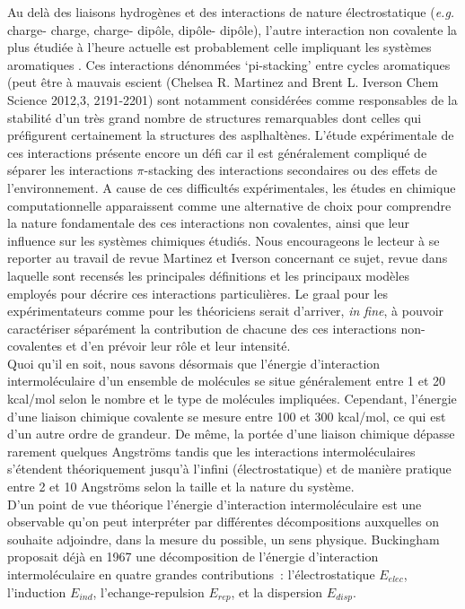 Au delà des liaisons hydrogènes et des interactions de nature électrostatique (\textit{e.g.} charge- charge, charge- dipôle, dipôle- dipôle), l’autre interaction non covalente la plus étudiée à l’heure actuelle est probablement celle impliquant les systèmes aromatiques \cite{grimme2008special}. Ces interactions dénommées ‘pi-stacking’ entre cycles aromatiques (peut être à mauvais escient (Chelsea R. Martinez and Brent L. Iverson Chem Science 2012,3, 2191-2201) sont notamment considérées comme responsables de la stabilité d’un très grand nombre de structures remarquables \cite{mcgaughey1998pi} dont celles qui préfigurent certainement la structures des asplhaltènes. L’étude expérimentale de ces interactions présente encore un défi car il est généralement compliqué de séparer les interactions $\pi$-stacking des interactions secondaires ou des effets de l’environnement. A cause de ces difficultés expérimentales, les études en chimique computationnelle apparaissent comme une alternative de choix pour comprendre la nature fondamentale des ces interactions non covalentes, ainsi que leur influence sur les systèmes chimiques étudiés. Nous encourageons le lecteur à se reporter au travail de revue Martinez et Iverson concernant ce sujet, revue dans laquelle sont recensés les principales définitions et les principaux modèles employés pour décrire ces interactions particulières.
Le graal pour les expérimentateurs comme pour les théoriciens serait d’arriver, \textit{in fine}, à pouvoir caractériser séparément la contribution de chacune des ces interactions non-covalentes et d’en prévoir leur rôle et leur intensité.\\

Quoi qu’il en soit, nous savons désormais que l’énergie d'interaction intermoléculaire d'un ensemble de molécules se situe généralement entre 1 et 20 kcal/mol selon le nombre et le type de molécules impliquées. Cependant, l'énergie d'une liaison chimique covalente se mesure entre 100 et 300 kcal/mol, ce qui est d’un autre ordre de grandeur. De même, la portée d’une liaison chimique dépasse rarement quelques Angströms tandis que les interactions intermoléculaires s'étendent théoriquement jusqu'à l'infini (électrostatique) et de manière pratique entre 2 et 10 Angströms selon la taille et la nature du système.\\

D’un point de vue théorique l’énergie d’interaction intermoléculaire est une observable qu’on peut interpréter par différentes décompositions auxquelles on souhaite adjoindre, dans la mesure du possible, un sens physique. Buckingham \cite{buckingham1967permanent} proposait déjà en 1967 une décomposition de l’énergie d’interaction intermoléculaire en quatre grandes contributions : l’électrostatique $E_{elec}$, l’induction $E_{ind}$, l’echange-repulsion $E_{rep}$, et la dispersion $E_{disp}$.\\

